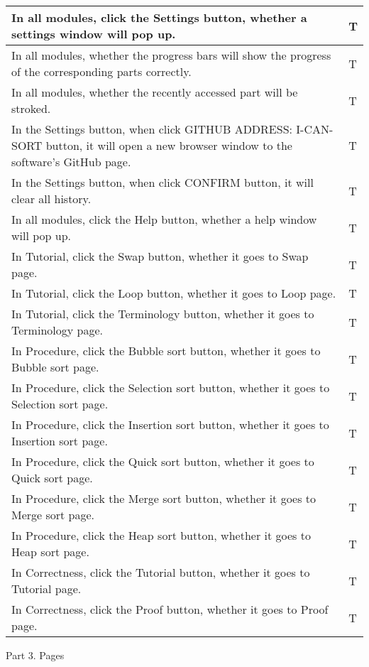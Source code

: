 \documentclass[
]{article}
\begin{document}
\begin{longtable}[]{@{}ll@{}}
\toprule
In all modules, click the Settings button, whether a settings window
will pop up. & T \\
\midrule
\endhead
In all modules, whether the progress bars will show the progress of the
corresponding parts correctly. & T \\
In all modules, whether the recently accessed part will be stroked. &
T \\
In the Settings button, when click GITHUB ADDRESS: I-CAN-SORT button, it
will open a new browser window to the software's GitHub page. & T \\
In the Settings button, when click CONFIRM button, it will clear all
history. & T \\
In all modules, click the Help button, whether a help window will pop
up. & T \\
In Tutorial, click the Swap button, whether it goes to Swap page. & T \\
In Tutorial, click the Loop button, whether it goes to Loop page. & T \\
In Tutorial, click the Terminology button, whether it goes to
Terminology page. & T \\
In Procedure, click the Bubble sort button, whether it goes to Bubble
sort page. & T \\
In Procedure, click the Selection sort button, whether it goes to
Selection sort page. & T \\
In Procedure, click the Insertion sort button, whether it goes to
Insertion sort page. & T \\
In Procedure, click the Quick sort button, whether it goes to Quick sort
page. & T \\
In Procedure, click the Merge sort button, whether it goes to Merge sort
page. & T \\
In Procedure, click the Heap sort button, whether it goes to Heap sort
page. & T \\
In Correctness, click the Tutorial button, whether it goes to Tutorial
page. & T \\
In Correctness, click the Proof button, whether it goes to Proof page. &
T \\
\bottomrule
\end{longtable}

Part 3. Pages
\end{document}
